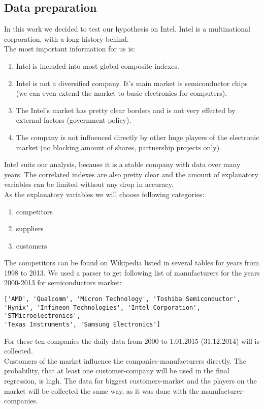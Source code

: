 \documentclass {article}
\begin{document}
\subsection{Data preparation}
In this work we decided to test our hypothesis on Intel. Intel is a multinational corporation, with a long history behind.\\
The most important information for us is:
\begin{enumerate}
	\item Intel is included into most global composite indexes.
	\item Intel is not a diversified company. It's main market is semiconductor chips (we can even extend the market to basic electronics for computers). 
	\item The Intel's market has pretty clear borders and is not very effected by external factors (government policy). 
	\item The company is not influenced directly by other huge players of the electronic market (no blocking amount of shares, partnership projects only).
\end{enumerate}
Intel suits our analysis, because it is a stable company with data over many years. The correlated indexes are also pretty clear and the amount of explanatory variables can be limited without any drop in accuracy.\\
As the explanatory variables we will choose following categories:
\begin{enumerate}
	\item competitors
	\item suppliers
	\item customers
\end{enumerate} 
The competitors can be found on Wikipedia listed in several tables for years from 1998 to 2013. We used a parser to get following list of manufacturers for the years 2000-2013 for semiconductors market:
\begin{verbatim}
['AMD', 'Qualcomm', 'Micron Technology', 'Toshiba Semiconductor', 
'Hynix', 'Infineon Technologies', 'Intel Corporation', 'STMicroelectronics', 
'Texas Instruments', 'Samsung Electronics']
\end{verbatim}
For these ten companies the daily data from 2000 to 1.01.2015 (31.12.2014) will is collected.\\
Customers of the market influence the companies-manufacturers directly. The probability, that at least one customer-company will be used in the final regression, is high. The data for biggest customers-market and the players on the market will be collected the same way, as it was done with the manufacturer-companies.
\end{document}

